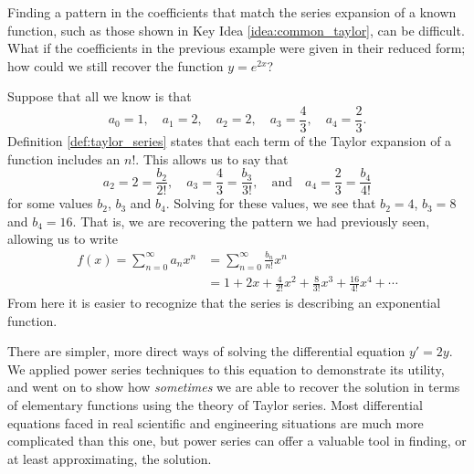 Finding a pattern in the coefficients that match the series expansion of a known function, such as those shown in Key Idea \ref{idea:common_taylor}, can be difficult. What if the coefficients in the previous example were given in their reduced form; how could we still recover the function $y=e^{2x}$?

Suppose that all we know is that 
$$a_0=1,\quad a_1=2,\quad a_2=2,\quad a_3=\frac43,\quad a_4=\frac23.$$
Definition \ref{def:taylor_series} states that each term of the Taylor expansion of a function includes an $n!$. This allows us to say that
$$a_2=2=\frac{b_2}{2!},\quad a_3 = \frac43=\frac{b_3}{3!},\quad \text{and}\quad a_4 = \frac23=\frac{b_4}{4!}$$
for some values $b_2$, $b_3$ and $b_4$.
Solving for these values, we see that $b_2=4$, $b_3 = 8$ and $b_4=16$. That is, we are recovering the pattern we had previously seen, allowing us to write 
\begin{align*}
f(x) = \sum_{n=0}^\infty a_nx^n &= \sum_{n=0}^\infty \frac{b_n}{n!}x^n \\
			&= 1+2x+ \frac{4}{2!}x^2 + \frac{8}{3!}x^3+\frac{16}{4!}x^4 + \cdots
\end{align*}
From here it is easier to recognize that the series is describing an exponential function.

There are simpler, more direct ways of solving the differential equation $y' = 2y$. We applied power series techniques to this equation to demonstrate its utility, and went on to show how \emph{sometimes} we are able to recover the solution in terms of elementary functions using the theory of Taylor series. Most differential equations faced in real scientific and engineering situations are much more complicated than this one, but power series can offer a valuable tool in finding, or at least approximating, the solution.





